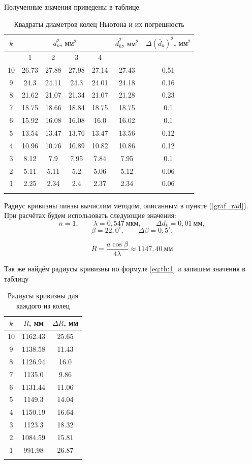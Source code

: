 Полученные значения приведены в таблице.
\begin{table}[H]
	\centering
	\caption{Квадраты диаметров колец Ньютона и их погрешность}
	\begin{tabular}{ccccccc}
		\toprule
		$k$ & \multicolumn{4}{c}{$d_k^2$, $\text{мм}^2$} &  $\overline{d}_k^2$, $\text{мм}^2$ & $\Delta (\overline{d}_k)^2$, $\text{мм}^2$\\
		\midrule
		& 1 & 2 & 3 & 4 &  & \\
		\midrule
		10 & 26.73 & 27.88 & 27.98 & 27.14 & 27.43 &  0.51 \\
		9 & 24.3 & 24.11 & 24.3 & 24.01 & 24.18 &  0.16 \\
		8 & 21.62 & 21.07 & 21.34 & 21.07 & 21.28 &  0.23 \\
		7 & 18.75 & 18.66 & 18.84 & 18.75 & 18.75 &  0.1 \\
		6 & 15.92 & 16.08 & 16.08 & 16.0 & 16.02 &  0.1 \\
		5 & 13.54 & 13.47 & 13.76 & 13.47 & 13.56 &  0.12 \\
		4 & 10.96 & 10.76 & 10.89 & 10.82 & 10.86 &  0.12 \\
		3 & 8.12 & 7.9 & 7.95 & 7.84 & 7.95 &  0.1 \\
		2 & 5.11 & 5.11 & 5.2 & 5.06 & 5.12 &  0.06 \\
		1 & 2.25 & 2.34 & 2.4 & 2.37 & 2.34 &  0.06 \\
		\bottomrule& 
	\end{tabular}
\end{table}

Радиус кривизны линзы вычислим методом, описанным в пункте (\ref{graf_rad}). При расчётах будем использовать следующие значения:
\[
n = 1, \qquad
\lambda = 0{,}547\ \text{мкм}, \qquad
\Delta d_k = 0{,}01\ \text{мм},
\]
\[
\beta = 22{,}0^\circ, \qquad
\Delta \beta = 0{,}5^\circ.
\]

\[
R = \frac{a \cos \beta}{4 \lambda} \approx 1147,40 ~\text{мм}
\]

Так же найдём радиусы кривизны по формуле \cref{eq:th:1} и запишем значения в таблицу

\begin{table}[H]
	\centering
	\caption{Радиусы кривизны для каждого из колец}
	\begin{tabular}{ccc}
		\toprule
		$k$ & $R$, мм & $\Delta R$, мм \\
		\midrule
		10 & 1162.43 & 25.65 \\
		9 & 1138.58 & 11.43 \\
		8 & 1126.94 & 16.0 \\
		7 & 1135.0 & 9.86 \\
		6 & 1131.44 & 11.06 \\
		5 & 1149.3 & 14.04 \\
		4 & 1150.19 & 16.64 \\
		3 & 1123.3 & 18.32 \\
		2 & 1084.59 & 15.81 \\
		1 & 991.98 & 26.87 \\
		\bottomrule& 
	\end{tabular}
\end{table}

